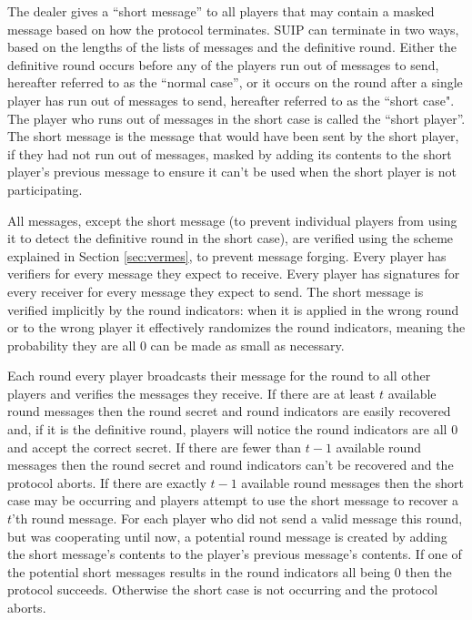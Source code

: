 \documentclass{dalcsthesis}
\begin{document}
The dealer gives a ``short message'' to all players that may contain a masked message based on how the protocol terminates. SUIP can terminate in two ways, based on the lengths of the lists of messages and the definitive round. Either the definitive round occurs before any of the players run out of messages to send, hereafter referred to as the ``normal case'', or it occurs on the round after a single player has run out of messages to send, hereafter referred to as the ``short case". The player who runs out of messages in the short case is called the ``short player''. The short message is the message that would have been sent by the short player, if they had not run out of messages, masked by adding its contents to the short player's previous message to ensure it can't be used when the short player is not participating.

All messages, except the short message (to prevent individual players from using it to detect the definitive round in the short case), are verified using the scheme explained in Section \ref{sec:vermes}, to prevent message forging. Every player has verifiers for every message they expect to receive. Every player has signatures for every receiver for every message they expect to send. The short message is verified implicitly by the round indicators: when it is applied in the wrong round or to the wrong player it effectively randomizes the round indicators, meaning the probability they are all 0 can be made as small as necessary.

Each round every player broadcasts their message for the round to all other players and verifies the messages they receive. If there are at least $t$ available round messages then the round secret and round indicators are easily recovered and, if it is the definitive round, players will notice the round indicators are all $0$ and accept the correct secret. If there are fewer than $t-1$ available round messages then the round secret and round indicators can't be recovered and the protocol aborts. If there are exactly $t-1$ available round messages then the short case may be occurring and players attempt to use the short message to recover a $t$'th round message. For each player who did not send a valid message this round, but was cooperating until now, a potential round message is created by adding the short message's contents to the player's previous message's contents. If one of the potential short messages results in the round indicators all being 0 then the protocol succeeds. Otherwise the short case is not occurring and the protocol aborts.
\end{document}
